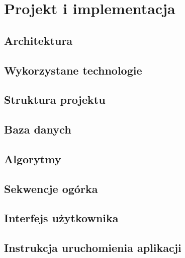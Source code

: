 \chapter{Projekt i implementacja}
\label{section:projekt_i_implementacja}

\section{Architektura}

\section{Wykorzystane technologie}

\section{Struktura projektu}

\section{Baza danych}

\section{Algorytmy}

\section{Sekwencje ogórka}

\section{Interfejs użytkownika}

\section{Instrukcja uruchomienia aplikacji}

